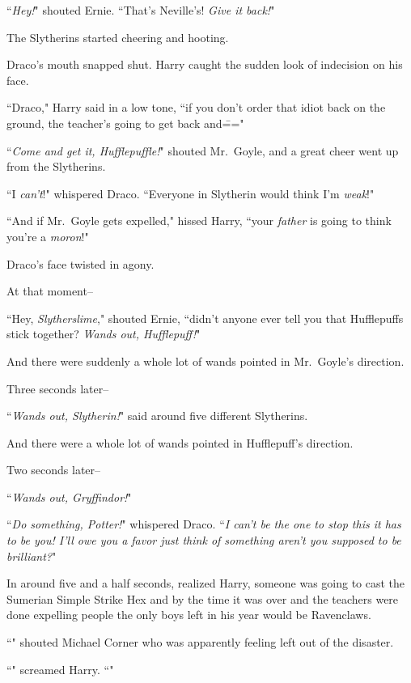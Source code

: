 ``\emph{Hey!}" shouted Ernie. ``That's Neville's! \emph{Give it back!}"

The Slytherins started cheering and hooting.

Draco's mouth snapped shut. Harry caught the sudden look of indecision on his face.

``Draco," Harry said in a low tone, ``if you don't order that idiot back on the ground, the teacher's going to get back and\==="

``\emph{Come and get it, Hufflepuffle!}" shouted Mr.~Goyle, and a great cheer went up from the Slytherins.

``I \emph{can't}!" whispered Draco. ``Everyone in Slytherin would think I'm \emph{weak}!"

``And if Mr.~Goyle gets expelled," hissed Harry, ``your \emph{father} is going to think you're a \emph{moron}!"

Draco's face twisted in agony.

At that moment\---

``Hey, \emph{Slytherslime}," shouted Ernie, ``didn't anyone ever tell you that Hufflepuffs stick together? \emph{Wands out, Hufflepuff!}"

And there were suddenly a whole lot of wands pointed in Mr.~Goyle's direction.

Three seconds later\---

``\emph{Wands out, Slytherin!}" said around five different Slytherins.

And there were a whole lot of wands pointed in Hufflepuff's direction.

Two seconds later\---

``\emph{Wands out, Gryffindor!}"

``\emph{Do something, Potter!}" whispered Draco. ``\emph{I can't be the one to stop this it has to be you! I'll owe you a favor just think of something aren't you supposed to be brilliant?}"

In around five and a half seconds, realized Harry, someone was going to cast the Sumerian Simple Strike Hex and by the time it was over and the teachers were done expelling people the only boys left in his year would be Ravenclaws.

``" shouted Michael Corner who was apparently feeling left out of the disaster.

``" screamed Harry. ``"

